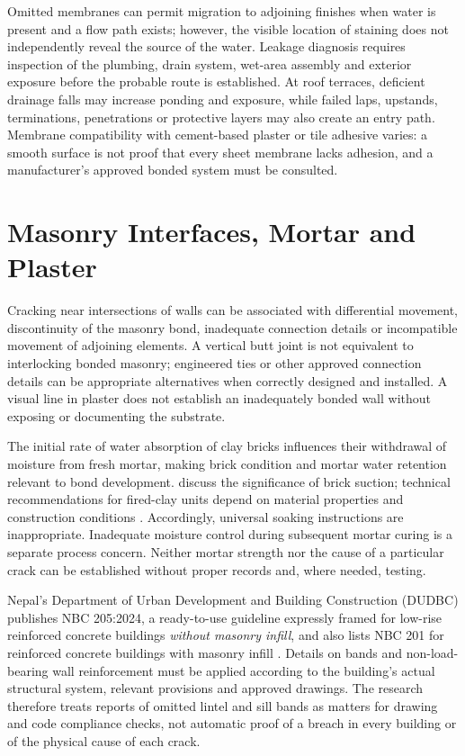 Omitted membranes can permit migration to adjoining finishes when water is present and a flow path exists; however, the visible location of staining does not independently reveal the source of the water. Leakage diagnosis requires inspection of the plumbing, drain system, wet-area assembly and exterior exposure before the probable route is established. At roof terraces, deficient drainage falls may increase ponding and exposure, while failed laps, upstands, terminations, penetrations or protective layers may also create an entry path. Membrane compatibility with cement-based plaster or tile adhesive varies: a smooth surface is not proof that every sheet membrane lacks adhesion, and a manufacturer's approved bonded system must be consulted.

\section{Masonry Interfaces, Mortar and Plaster}
Cracking near intersections of walls can be associated with differential movement, discontinuity of the masonry bond, inadequate connection details or incompatible movement of adjoining elements. A vertical butt joint is not equivalent to interlocking bonded masonry; engineered ties or other approved connection details can be appropriate alternatives when correctly designed and installed. A visual line in plaster does not establish an inadequately bonded wall without exposing or documenting the substrate.

The initial rate of water absorption of clay bricks influences their withdrawal of moisture from fresh mortar, making brick condition and mortar water retention relevant to bond development. \textcite{bailey1990} discuss the significance of brick suction; technical recommendations for fired-clay units depend on material properties and construction conditions \parencite{bia2026}. Accordingly, universal soaking instructions are inappropriate. Inadequate moisture control during subsequent mortar curing is a separate process concern. Neither mortar strength nor the cause of a particular crack can be established without proper records and, where needed, testing.

Nepal's Department of Urban Development and Building Construction (DUDBC) publishes NBC 205:2024, a ready-to-use guideline expressly framed for low-rise reinforced concrete buildings \emph{without masonry infill}, and also lists NBC 201 for reinforced concrete buildings with masonry infill \parencite{dudbc2024}. Details on bands and non-load-bearing wall reinforcement must be applied according to the building's actual structural system, relevant provisions and approved drawings. The research therefore treats reports of omitted lintel and sill bands as matters for drawing and code compliance checks, not automatic proof of a breach in every building or of the physical cause of each crack.


